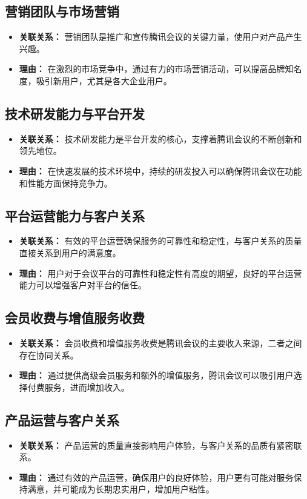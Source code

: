 \documentclass[a4paper,12pt]{article}
\begin{document}
\subsection{营销团队与市场营销}
\begin{itemize}
\item\textbf{关联关系：} 营销团队是推广和宣传腾讯会议的关键力量，使用户对产品产生兴趣。 
\item\textbf{理由：} 在激烈的市场竞争中，通过有力的市场营销活动，可以提高品牌知名度，吸引新用户，尤其是各大企业用户。
\end{itemize}
\subsection{技术研发能力与平台开发}
\begin{itemize}
\item\textbf{关联关系：} 技术研发能力是平台开发的核心，支撑着腾讯会议的不断创新和领先地位。 
\item\textbf{理由：} 在快速发展的技术环境中，持续的研发投入可以确保腾讯会议在功能和性能方面保持竞争力。
\end{itemize}
\subsection{平台运营能力与客户关系}
\begin{itemize}
\item\textbf{关联关系：} 有效的平台运营确保服务的可靠性和稳定性，与客户关系的质量直接关系到用户的满意度。 
\item\textbf{理由：} 用户对于会议平台的可靠性和稳定性有高度的期望，良好的平台运营能力可以增强客户对平台的信任。
\end{itemize}
\subsection{会员收费与增值服务收费}
\begin{itemize}
\item\textbf{关联关系：} 会员收费和增值服务收费是腾讯会议的主要收入来源，二者之间存在协同关系。 
\item\textbf{理由：} 通过提供高级会员服务和额外的增值服务，腾讯会议可以吸引用户选择付费服务，进而增加收入。
\end{itemize}
\subsection{产品运营与客户关系}
\begin{itemize}
\item\textbf{关联关系：} 产品运营的质量直接影响用户体验，与客户关系的品质有紧密联系。 
\item\textbf{理由：} 通过有效的产品运营，确保用户的良好体验，用户更有可能对服务保持满意，并可能成为长期忠实用户，增加用户粘性。
\end{itemize}
\end{document}
